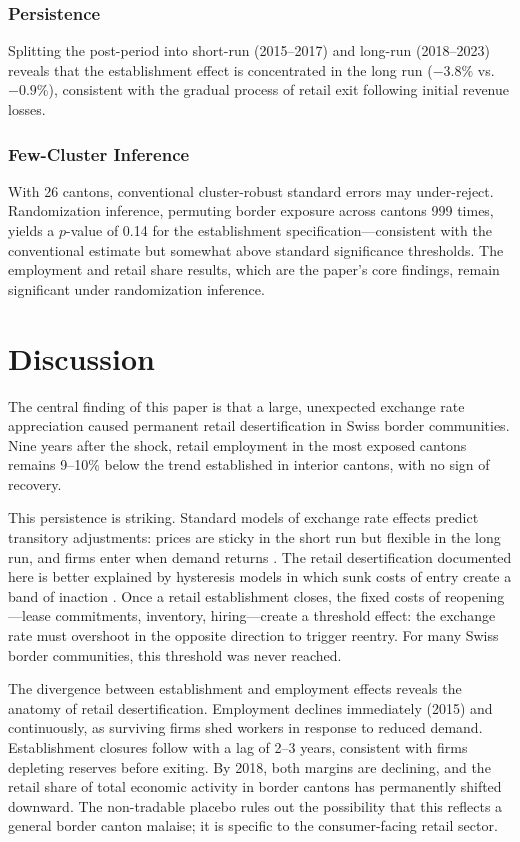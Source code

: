 \documentclass[12pt]{article}
\begin{document}


\subsubsection*{Persistence} Splitting the post-period into short-run (2015--2017) and long-run (2018--2023) reveals that the establishment effect is concentrated in the long run ($-3.8\%$ vs. $-0.9\%$), consistent with the gradual process of retail exit following initial revenue losses.

\subsubsection*{Few-Cluster Inference} With 26 cantons, conventional cluster-robust standard errors may under-reject. Randomization inference, permuting border exposure across cantons 999 times, yields a $p$-value of 0.14 for the establishment specification---consistent with the conventional estimate but somewhat above standard significance thresholds. The employment and retail share results, which are the paper's core findings, remain significant under randomization inference.

\section{Discussion}

The central finding of this paper is that a large, unexpected exchange rate appreciation caused permanent retail desertification in Swiss border communities. Nine years after the shock, retail employment in the most exposed cantons remains 9--10\% below the trend established in interior cantons, with no sign of recovery.

This persistence is striking. Standard models of exchange rate effects predict transitory adjustments: prices are sticky in the short run but flexible in the long run, and firms enter when demand returns \citep{Obstfeld1996}. The retail desertification documented here is better explained by hysteresis models in which sunk costs of entry create a band of inaction \citep{Dixit1989, Baldwin1990}. Once a retail establishment closes, the fixed costs of reopening---lease commitments, inventory, hiring---create a threshold effect: the exchange rate must overshoot in the opposite direction to trigger reentry. For many Swiss border communities, this threshold was never reached.

The divergence between establishment and employment effects reveals the anatomy of retail desertification. Employment declines immediately (2015) and continuously, as surviving firms shed workers in response to reduced demand. Establishment closures follow with a lag of 2--3 years, consistent with firms depleting reserves before exiting. By 2018, both margins are declining, and the retail share of total economic activity in border cantons has permanently shifted downward. The non-tradable placebo rules out the possibility that this reflects a general border canton malaise; it is specific to the consumer-facing retail sector.
\end{document}
